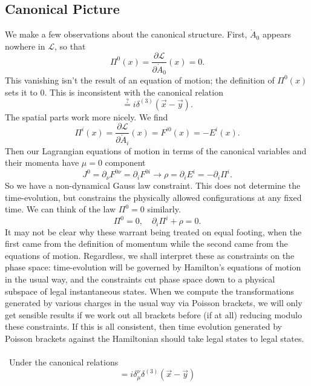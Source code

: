 \documentclass[11pt,letterpaper]{article}
\newcommand{\mc}[1]{\mathcal{#1}}
\newcommand{\D}{\partial}
\newcommand{\PA}[2]{\frac{\partial #1}{\partial #2}}
\begin{document}
\subsection{Canonical Picture}
We make a few observations about the canonical structure. First, $\dot{A}_0$ appears nowhere in $\mathcal{L}$, so that \begin{equation}
\Pi^0(x) = \PA{\mc{L}}{\dot{A}_0}(x) = 0.
\end{equation}
This vanishing isn't the result of an equation of motion; the definition of $\Pi^0(x)$ sets it to 0. This is inconsistent with the canonical relation \begin{equation}
[A_0(\vec{x}), \Pi^0(\vec{y})] \stackrel{?}{=} i \delta^{(3)}(\vec{x} - \vec{y}).
\end{equation}
The spatial parts work more nicely. We find \begin{equation}
\Pi^i(x) = \PA{\mc{L}}{\dot{A}_i}(x) = F^{i0}(x) = - E^i(x).
\end{equation}
Then our Lagrangian equations of motion in terms of the canonical variables and their momenta have $\mu = 0$ component \begin{equation}
J^0 = \D_\nu F^{0 \nu} = \D_i F^{0i} \to \rho = \D_i E^i = - \D_i \Pi^i.
\end{equation}
So we have a non-dynamical Gauss law constraint. This does not determine the time-evolution, but constrains the physically allowed configurations at any fixed time. We can think of the law $\Pi^0 = 0$ similarly. \begin{equation}
\Pi^0 = 0, \quad \D_i \Pi^i + \rho = 0.
\end{equation}
It may not be clear why these warrant being treated on equal footing, when the first came from the definition of momentum while the second came from the equations of motion. Regardless, we shall interpret these as constraints on the phase space: time-evolution will be governed by Hamilton's equations of motion in the usual way, and the constraints cut phase space down to a physical subspace of legal instantaneous states. When we compute the transformations generated by various charges in the usual way via Poisson brackets, we will only get sensible results if we work out all brackets before (if at all) reducing modulo these constraints. If this is all consistent, then time evolution generated by Poisson brackets against the Hamiltonian should take legal states to legal states.\\
\\
\
Under the canonical relations \begin{equation}
[A_\mu(\vec{x}), \Pi^\nu(\vec{y})] = i \delta_\mu^\nu  \delta^{(3)} (\vec{x} - \vec{y})
\end{equation}
\end{document}
